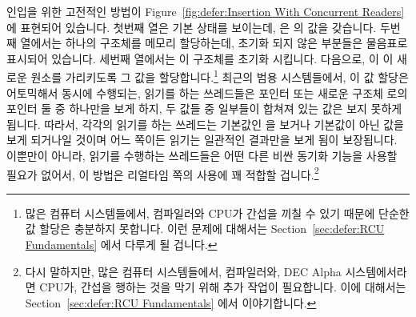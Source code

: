 인입을 위한 고전적인 방법이
Figure~\ref{fig:defer:Insertion With Concurrent Readers} 에 표현되어 있습니다.
첫번째 열은 기본 상태를 보이는데,  은  의 값을 갖습니다.
두번째 열에서는 하나의 구조체를 메모리 할당하는데, 초기화 되지 않은 부분들은
물음표로 표시되어 있습니다.
세번째 열에서는 이 구조체를 초기화 시킵니다.
다음으로,  이 이 새로운 원소를 가리키도록 그 값을
할당합니다.\footnote{
	많은 컴퓨터 시스템들에서, 컴파일러와 CPU가 간섭을 끼칠 수 있기 때문에
	단순한 값 할당은 충분하지 못합니다.
	이런 문제에 대해서는 Section~\ref{sec:defer:RCU Fundamentals} 에서
	다루게 될 겁니다.}
최근의 범용 시스템들에서, 이 값 할당은 어토믹해서 동시에 수행되는, 읽기를 하는
쓰레드들은  포인터 또는 새로운 구조체  로의 포인터 둘 중
하나만을 보게 하지, 두 값들 중 일부들이 합쳐져 있는 값은 보지 못하게 됩니다.
따라서, 각각의 읽기를 하는 쓰레드는 기본값인  을 보거나
기본값이 아닌 값을 보게 되거나일 것이며 어느 쪽이든 읽기는 일관적인 결과만을
보게 됨이 보장됩니다.
이뿐만이 아니라, 읽기를 수행하는 쓰레드들은 어떤 다른 비싼 동기화 기능을 사용할
필요가 없어서, 이 방법은 리얼타임 쪽의 사용에 꽤 적합할 겁니다.\footnote{
	다시 말하지만, 많은 컴퓨터 시스템들에서, 컴파일러와, DEC Alpha
	시스템에서라면 CPU가, 간섭을 행하는 것을 막기 위해 추가 작업이
	필요합니다.
	이에 대해서는 Section~\ref{sec:defer:RCU Fundamentals} 에서
	이야기합니다.}

